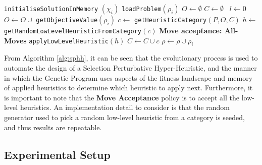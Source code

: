 \documentclass[a4paper,12pt]{article}
\begin{document}
{\begin{algorithm}[H]
{{                            %
                            \texttt{initialiseSolutionInMemory} $(\chi _i)$\;
                            \texttt{loadProblem}$(\rho_i)$ \;
                            $O \gets \emptyset$ \;
                            $C \gets \emptyset$ \;
                             \
                            $l \gets 0$ \;
                            \Do{
                                \texttt{currentTime()}$ - l < \varsigma$
                            }
                            {
                                $O \gets O \cup$ \texttt{getObjectiveValue}$(\rho_i)$\;
                                $c \gets $ \texttt{getHeuristicCategory}$(P,O,C)$ \; 
                                $h \gets $ \texttt{getRandomLowLevelHeuristicFromCategory}$(c)$\;
                                \textbf{Move acceptance: All-Moves}\;
                                \texttt{applyLowLevelHeuristic}$(h)$\;
                                $C \gets C \cup c$ \;
                            }  
                            $\rho \gets \rho \cup \rho_i $\;
                        } 
                        \KwRet{$\chi$}\; 
                    } 
                \end{algorithm} 
                \vspace{0.5cm} 
                \noindent From Algorithm \ref{alg:sphh}, it can be seen that the evolutionary process is used to automate the design
                of a Selection Perturbative Hyper-Heuristic, and the manner in which the Genetic Program uses aspects of the fitness landscape 
                and memory of applied heuristics to determine which heuristic to apply next. Furthermore, it is important to note that the \textbf{Move Acceptance}
                policy is to accept all the low-level heuristics. \newline  
                An implementation detail to consider is that the random generator used to pick a random low-level heuristic from a category is seeded, and thus 
                results are repeatable.
            }
    \newpage
    \subsection{Experimental Setup}
\end{document}
